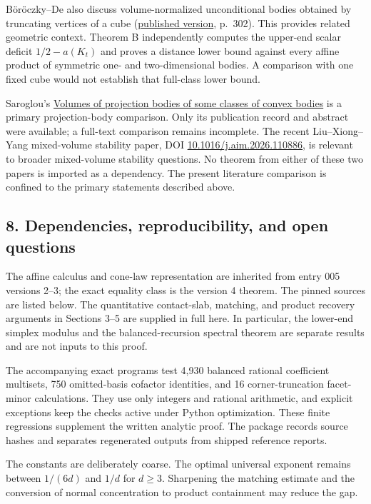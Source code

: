 \documentclass[
  11pt,
]{article}
\begin{document}
Böröczky--De also discuss volume-normalized unconditional bodies
obtained by truncating vertices of a cube
(\href{https://real.mtak.hu/196592/1/1-s2.0-S0022039621004393-main.pdf}{published
version}, p.~302). This provides related geometric context. Theorem B
independently computes the upper-end scalar deficit \(1/2-a(K_t)\) and
proves a distance lower bound against every affine product of symmetric
one- and two-dimensional bodies. A comparison with one fixed cube would
not establish that full-class lower bound.

Saroglou's \href{https://doi.org/10.1112/S0025579311001860}{Volumes of
projection bodies of some classes of convex bodies} is a primary
projection-body comparison. Only its publication record and abstract
were available; a full-text comparison remains incomplete. The recent
Liu--Xiong--Yang mixed-volume stability paper, DOI
\href{https://doi.org/10.1016/j.aim.2026.110886}{10.1016/j.aim.2026.110886},
is relevant to broader mixed-volume stability questions. No theorem from
either of these two papers is imported as a dependency. The present
literature comparison is confined to the primary statements described
above.

\subsection{8. Dependencies, reproducibility, and open
questions}\label{dependencies-reproducibility-and-open-questions}

The affine calculus and cone-law representation are inherited from entry
005 versions 2--3; the exact equality class is the version 4 theorem.
The pinned sources are listed below. The quantitative contact-slab,
matching, and product recovery arguments in Sections 3--5 are supplied
in full here. In particular, the lower-end simplex modulus and the
balanced-recursion spectral theorem are separate results and are not
inputs to this proof.

The accompanying exact programs test 4,930 balanced rational coefficient
multisets, 750 omitted-basis cofactor identities, and 16
corner-truncation facet-minor calculations. They use only integers and
rational arithmetic, and explicit exceptions keep the checks active
under Python optimization. These finite regressions supplement the
written analytic proof. The package records source hashes and separates
regenerated outputs from shipped reference reports.

The constants are deliberately coarse. The optimal universal exponent
remains between \(1/(6d)\) and \(1/d\) for \(d\ge3\). Sharpening the
matching estimate and the conversion of normal concentration to product
containment may reduce the gap.
\end{document}
